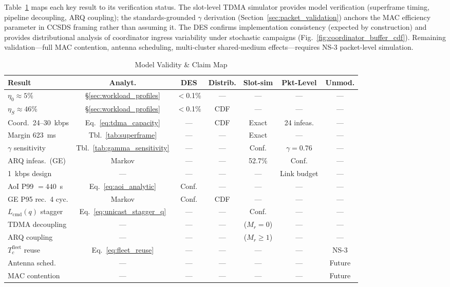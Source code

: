 \documentclass[journal]{IEEEtran}
\begin{document}
Table~\ref{tab:claim_map} maps each key result to its verification status. The slot-level TDMA simulator provides model verification (superframe timing, pipeline decoupling, ARQ coupling); the standards-grounded $\gamma$ derivation (Section~\ref{sec:packet_validation}) anchors the MAC efficiency parameter in CCSDS framing rather than assuming it. The DES confirms implementation consistency (expected by construction) and provides distributional analysis of coordinator ingress variability under stochastic campaigns (Fig.~\ref{fig:coordinator_buffer_cdf}). Remaining validation---full MAC contention, antenna scheduling, multi-cluster shared-medium effects---requires NS-3 packet-level simulation.

\begin{table}[t]
    \centering
    \caption{Model Validity \& Claim Map}
    \label{tab:claim_map}
    \footnotesize
    \begin{tabular}{@{}lcccccc@{}}
        \toprule
        \textbf{Result} & \textbf{Analyt.} & \textbf{DES} & \textbf{Distrib.} & \textbf{Slot-sim} & \textbf{Pkt-Level} & \textbf{Unmod.} \\
        \midrule
        $\eta_0 \approx 5\%$ & \S\ref{sec:workload_profiles} & $<$0.1\% & --- & --- & --- & --- \\
        $\eta_S \approx 46\%$ & \S\ref{sec:workload_profiles} & $<$0.1\% & CDF & --- & --- & --- \\
        Coord.\ 24--30~kbps & Eq.~\ref{eq:tdma_capacity} & --- & CDF & Exact & 24 infeas. & --- \\
        Margin 623~ms & Tbl.~\ref{tab:superframe} & --- & --- & Exact & --- & --- \\
        $\gamma$ sensitivity & Tbl.~\ref{tab:gamma_sensitivity} & --- & --- & Conf. & $\gamma\!=\!0.76$ & --- \\
        ARQ infeas.\ (GE) & Markov & --- & --- & 52.7\% & Conf. & --- \\
        1~kbps design & --- & --- & --- & --- & Link budget & --- \\
        AoI P99 $= 440$~s & Eq.~\ref{eq:aoi_analytic} & Conf. & --- & --- & --- & --- \\
        GE P95 rec.\ 4 cyc. & Markov & Conf. & CDF & --- & --- & --- \\
        $L_{\text{cmd}}(q)$ stagger & Eq.~\ref{eq:unicast_stagger_q} & --- & --- & Conf. & --- & --- \\
        TDMA decoupling & --- & --- & --- & ($M_r\!=\!0$) & --- & --- \\
        ARQ coupling & --- & --- & --- & ($M_r\!\geq\!1$) & --- & --- \\
        $T_c^{\text{fleet}}$ reuse & Eq.~\ref{eq:fleet_reuse} & --- & --- & --- & --- & NS-3 \\
        Antenna sched. & --- & --- & --- & --- & --- & Future \\
        MAC contention & --- & --- & --- & --- & --- & Future \\
        \bottomrule
    \end{tabular}
\end{table}
\end{document}
